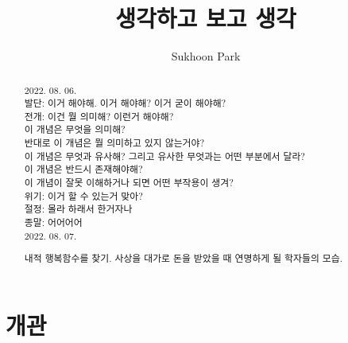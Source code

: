 \documentclass[12pt, a4paper]{article}
\begin{document}
\title{생각하고 보고 생각}
\author{Sukhoon Park}
\maketitle

\begin{abstract}

2022. 08. 06. \\
발단: 이거 해야해. 이거 해야해? 이거 굳이 해야해? \\
전개: 이건 뭘 의미해? 이런거 해야해? \\
이 개념은 무엇을 의미해? \\
반대로 이 개념은 뭘 의미하고 있지 않는거야? \\
이 개념은 무엇과 유사해? 그리고 유사한 무엇과는 어떤 부분에서 달라? \\
이 개념은 반드시 존재해야해? \\
이 개념이 잘못 이해하거나 되면 어떤 부작용이 생겨? \\
위기: 이거 할 수 있는거 맞아? \\
절정: 몰라 하래서 한거자나 \\
종말: 어어어어 \\

2022. 08. 07.

내적 행복함수를 찾기. 사상을 대가로 돈을 받았을 때 연명하게 될 학자들의 모습. \\


\end{abstract}

\newpage
\section{개관} \\
\end{document}
